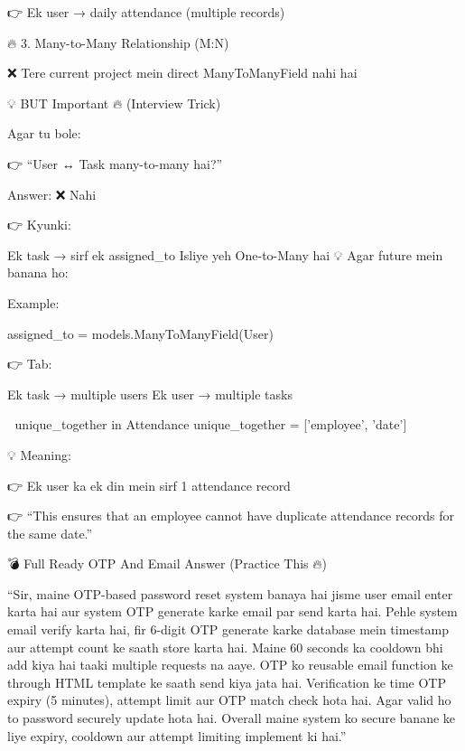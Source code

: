 👉 Ek user → daily attendance (multiple records)

🔥 3. Many-to-Many Relationship (M:N)

❌ Tere current project mein direct ManyToManyField nahi hai

💡 BUT Important 🔥 (Interview Trick)

Agar tu bole:

👉 “User ↔ Task many-to-many hai?”

Answer:
❌ Nahi

👉 Kyunki:

Ek task → sirf ek assigned_to
Isliye yeh One-to-Many hai
💡 Agar future mein banana ho:

Example:

assigned_to = models.ManyToManyField(User)

👉 Tab:

Ek task → multiple users
Ek user → multiple tasks

🧠 unique_together in Attendance
unique_together = ['employee', 'date']

💡 Meaning:

👉 Ek user ka ek din mein sirf 1 attendance record

👉 “This ensures that an employee cannot have duplicate attendance records for the same date.”


💣 Full Ready OTP And Email Answer (Practice This 🔥)


“Sir, maine OTP-based password reset system banaya hai jisme user email enter karta hai aur system OTP generate karke email par send karta hai.
Pehle system email verify karta hai, fir 6-digit OTP generate karke database mein timestamp aur attempt count ke saath store karta hai.
Maine 60 seconds ka cooldown bhi add kiya hai taaki multiple requests na aaye.
OTP ko reusable email function ke through HTML template ke saath send kiya jata hai.
Verification ke time OTP expiry (5 minutes), attempt limit aur OTP match check hota hai.
Agar valid ho to password securely update hota hai.
Overall maine system ko secure banane ke liye expiry, cooldown aur attempt limiting implement ki hai.”